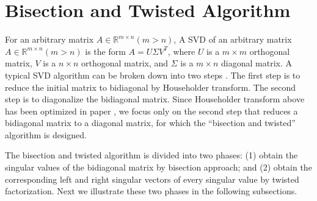 \vspace{-0.1in}
\section{Bisection and Twisted Algorithm} \label{sec:algorithm}
\vspace{-0.1in}
For an arbitrary matrix $A\in \mathbb{R}^{m \times n} (m>n)$, 
A SVD of an arbitrary matrix $A\in \mathbb{R}^{m \times n} (m>n)$ is the form $A = U \Sigma V^T$, where $U$ is a $m \times m$ orthogonal matrix, $V$ is a $n\times n$ orthogonal matrix, and $\Sigma$ is a $m\times n$ diagonal matrix.
A typical SVD algorithm can be broken down into two steps \cite{65SIAM}.
The first step is to reduce the initial matrix to bidiagonal by Householder transform.
The second step is to diagonalize the bidiagonal matrix.
Since Householder transform above has been optimized in paper \cite{LiuHouseholder}, we focus only on the second step that reduces a bidiagonal matrix to a diagonal matrix, for which the  ``bisection and twisted'' algorithm is designed.

 
The bisection and twisted algorithm is divided into two phases:
(1) obtain the singular values of the bidiagonal matrix by bisection approach; and
(2) obtain the corresponding left and right singular vectors of every singular value by twisted factorization.
Next we illustrate these two phases in the following subsections.

\vspace{-0.1in}

